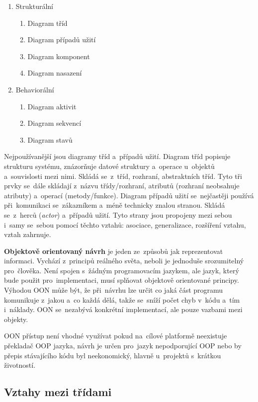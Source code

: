 \begin{enumerate}
	\item Strukturální
	      \begin{enumerate}
		      \item Diagram tříd
		      \item Diagram případů užití
		      \item Diagram komponent
		      \item Diagram nasazení
	      \end{enumerate}
	\item Behaviorální
	      \begin{enumerate}
		      \item Diagram aktivit
		      \item Diagram sekvencí
		      \item Diagram stavů
	      \end{enumerate}
\end{enumerate}

Nejpoužívanější jsou diagramy tříd a~případů užití. Diagram tříd popisuje strukturu systému, znázorňuje datové struktury a~operace u~objektů a~souvislosti mezi nimi. Skládá se~z~tříd, rozhraní, abstraktních tříd. Tyto tři prvky se~dále skládají z~názvu třídy/rozhraní, atributů (rozhraní neobsahuje atributy) a~operací (metody/funkce). Diagram případů užití se~nejčastěji používá při~komunikaci se~zákazníkem a~méně technicky znalou stranou. Skládá se~z~herců (\emph{actor}) a~případů užití. Tyto strany jsou propojeny mezi sebou i~samy se~sebou pomocí těchto vztahů: asociace, generalizace, rozšíření vztahu, vztah zahrnuje.

\textbf{Objektově orientovaný návrh} je jeden ze~způsobů jak reprezentovat informaci. Vychází z~principů reálného světa, neboli je jednoduše srozumitelný pro~člověka. Není spojen s~žádným programovacím jazykem, ale jazyk, který bude použit pro~implementaci, musí splňovat objektově orientované principy. Výhodou OON může být, že při~návrhu lze určit co jaká část programu komunikuje z~jakou a~co každá dělá, takže se~sníží počet chyb v~kódu a~tím i~náklady. OON se~nezabývá konkrétní implementací, ale pouze vazbami mezi objekty.

OON přístup není vhodné využívat pokud na~cílové platformě neexistuje překladač OOP jazyka, návrh je určen pro~jazyk nepodporující OOP nebo by přepis stávajícího kódu byl neekonomický, hlavně u~projektů s~krátkou životností.

\subsection{Vztahy mezi třídami}

